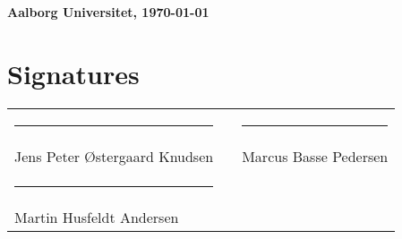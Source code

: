 \newpage

\begin{flushright}
\textbf{Aalborg Universitet, \today}
\end{flushright}


\section*{Signatures} 


\vspace{2.5cm}
\begin{tabular}{lcl}
  \rule{7cm}{1pt} & \hspace{0.5cm} & \rule{7cm}{1pt} \\
    \vspace{2.5cm}
    Jens Peter Østergaard Knudsen & & Marcus Basse Pedersen \\ \rule{7cm}{1pt} & \hspace{0.5cm}\\
    \vspace{4.5cm}
    Martin Husfeldt Andersen
    \vspace{7.5cm}
\end{tabular}
\vspace{1cm}

\pagebreak
{\pagestyle{plain}
\tableofcontents
\label{page:toc}
}



